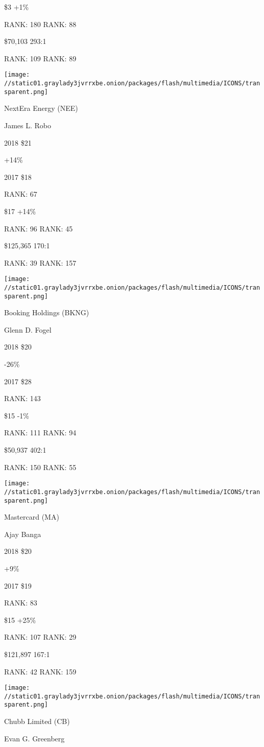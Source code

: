  \$3 +1\%

RANK: 180 RANK: 88

 \$70,103 293:1

RANK: 109 RANK: 89

\texttt{[image: //static01.graylady3jvrrxbe.onion/packages/flash/multimedia/ICONS/transparent.png]}

NextEra Energy (NEE)

James L. Robo \protect\hyperlink{g-footnotes}{}

2018 \$21

 +14\%

2017 \$18

RANK: 67

 \$17 +14\%

RANK: 96 RANK: 45

 \$125,365 170:1

RANK: 39 RANK: 157

\texttt{[image: //static01.graylady3jvrrxbe.onion/packages/flash/multimedia/ICONS/transparent.png]}

Booking Holdings (BKNG)

Glenn D. Fogel \protect\hyperlink{g-footnotes}{}

2018 \$20

 -26\%

2017 \$28

RANK: 143

 \$15 -1\%

RANK: 111 RANK: 94

 \$50,937 402:1

RANK: 150 RANK: 55

\texttt{[image: //static01.graylady3jvrrxbe.onion/packages/flash/multimedia/ICONS/transparent.png]}

Mastercard (MA)

Ajay Banga \protect\hyperlink{g-footnotes}{}

2018 \$20

 +9\%

2017 \$19

RANK: 83

 \$15 +25\%

RANK: 107 RANK: 29

 \$121,897 167:1

RANK: 42 RANK: 159

\texttt{[image: //static01.graylady3jvrrxbe.onion/packages/flash/multimedia/ICONS/transparent.png]}

Chubb Limited (CB)

Evan G. Greenberg \protect\hyperlink{g-footnotes}{}

